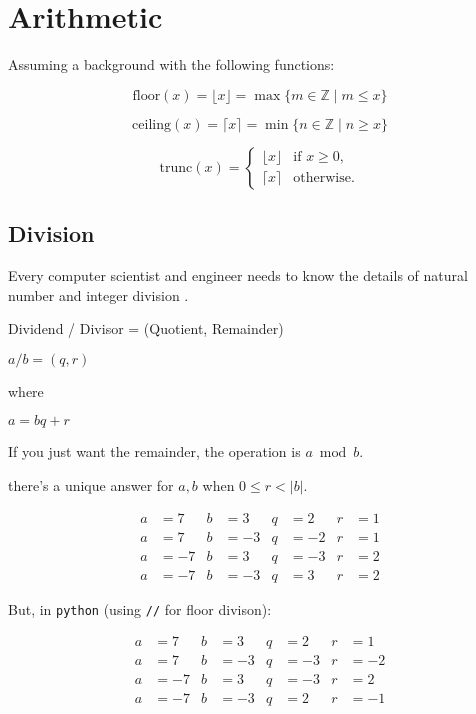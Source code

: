\chapter{Arithmetic}

Assuming a background with the following functions:

\begin{equation*}
  \text{floor}(x) = \lfloor x \rfloor = \max\{m \in \mathbb{Z} \mid m \leq x \}
\end{equation*}

\begin{equation*}
  \text{ceiling}(x) = \lceil x \rceil = \min\{n \in \mathbb{Z} \mid n \geq x \}
\end{equation*}

\begin{equation*}
\mathrm{trunc}(x) = \begin{cases}
\lfloor x \rfloor &\text{if $x \geq 0$,}\\
\lceil x \rceil &\text{otherwise.}
\end{cases}
\end{equation*}

\section{Division}

Every computer scientist and engineer needs to know the details of natural
number and integer division \cite{division-and-modulus-for-computer-scientists}.

Dividend / Divisor = (Quotient, Remainder)

$a / b = (q, r)$

where

$a = bq + r$

If you just want the remainder, the operation is $a \bmod b$.

there's a unique answer for $a, b$ when $0 \leq r < |b|$.

\begin{align*}
a &= 7  & b &= 3  & q &= 2  & r &= 1\\
a &= 7  & b &= -3 & q &= -2 & r &= 1\\
a &= -7 & b &= 3  & q &= -3 & r &= 2\\
a &= -7 & b &= -3 & q &= 3  & r &= 2
\end{align*}

But, in \texttt{python} (using \texttt{//} for floor divison):

\begin{align*}
a &= 7  & b &= 3  & q &= 2  & r &= 1\\
a &= 7  & b &= -3 & q &= -3 & r &= -2\\
a &= -7 & b &= 3  & q &= -3 & r &= 2\\
a &= -7 & b &= -3 & q &= 2  & r &= -1
\end{align*}

